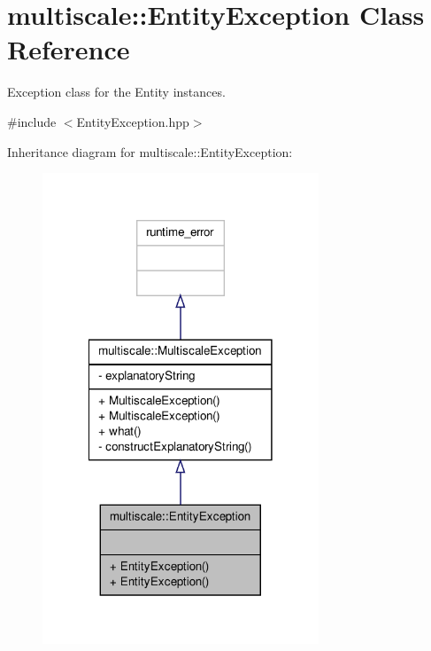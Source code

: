 \hypertarget{classmultiscale_1_1EntityException}{\section{multiscale\-:\-:Entity\-Exception Class Reference}
\label{classmultiscale_1_1EntityException}
}


Exception class for the Entity instances.  




{\ttfamily \#include $<$Entity\-Exception.\-hpp$>$}



Inheritance diagram for multiscale\-:\-:Entity\-Exception\-:\nopagebreak
\begin{figure}[H]
\begin{center}
\leavevmode
\includegraphics[width=234pt]{classmultiscale_1_1EntityException__inherit__graph}
\end{center}
\end{figure}


